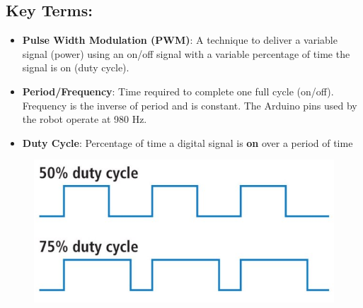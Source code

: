 \documentclass{handout}
\begin{document}
	\subsection{Key Terms:}
	\begin{itemize}
		\item \textbf{Pulse Width Modulation (PWM)}: A technique to deliver a variable signal (power) using an on/off signal with a variable percentage of time the signal is on (duty cycle).
		\item \textbf{Period/Frequency}: Time required to complete one full cycle (on/off). Frequency is the inverse of period and is constant. The Arduino pins used by the robot operate at 980 Hz.
		\item \textbf{Duty Cycle}: Percentage of time a digital signal is \textbf{on} over a period of time
	\end{itemize}


	
	\begin{figure} [H]
	\centering
	\includegraphics[width=.5\textwidth]{Figure1.PNG}
\end{figure}	
	
\end{document}
